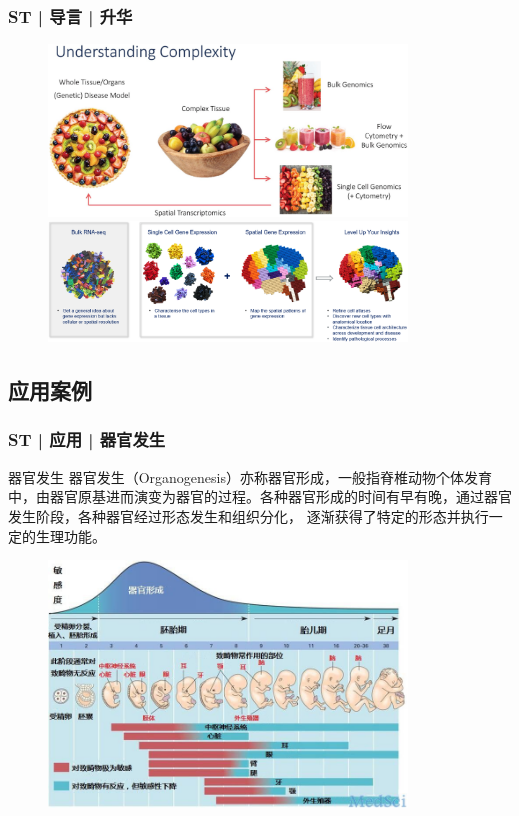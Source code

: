 \documentclass[11pt]{ctexbeamer}
\begin{document}
\begin{frame}
	\frametitle{ST | 导言 | 升华}
	\begin{figure}
		\includegraphics[width=0.85\textwidth]{ST_vs_scRNA_05.png}\\
		\vspace{0.3em}
		\includegraphics[width=0.85\textwidth]{ST_vs_scRNA_08.png}
	\end{figure}
\end{frame}

\subsection{应用案例}
\begin{frame}
	\frametitle{ST | 应用 | 器官发生}
	\begin{block}{器官发生}
		器官发生（Organogenesis）亦称器官形成，一般指脊椎动物个体发育中，由器官原基进而演变为器官的过程。各种器官形成的时间有早有晚，通过器官发生阶段，各种器官经过形态发生和组织分化， 逐渐获得了特定的形态并执行一定的生理功能。
		\end{block}
		\begin{figure}
		\includegraphics[width=0.85\textwidth]{ST_development_01.png}
	\end{figure}
\end{frame}
\end{document}
